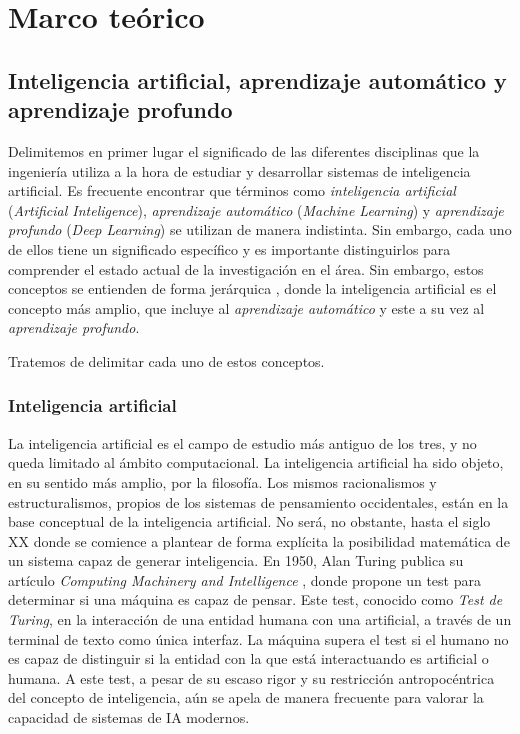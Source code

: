 \chapter{Marco teórico}

\section{Inteligencia artificial, aprendizaje automático y aprendizaje profundo}

Delimitemos en primer lugar el significado de las diferentes disciplinas que la ingeniería utiliza a la hora de estudiar y desarrollar sistemas de inteligencia artificial. Es frecuente encontrar que términos como \textit{inteligencia artificial} (\textit{Artificial Inteligence}), \textit{aprendizaje automático} (\textit{Machine Learning}) y \textit{aprendizaje profundo} (\textit{Deep Learning}) se utilizan de manera indistinta. Sin embargo, cada uno de ellos tiene un significado específico y es importante distinguirlos para comprender el estado actual de la investigación en el área. Sin embargo, estos conceptos se entienden de forma jerárquica \cite{}, donde la inteligencia artificial es el concepto más amplio, que incluye al \textit{aprendizaje automático} y este a su vez al \textit{aprendizaje profundo}.

Tratemos de delimitar cada uno de estos conceptos.

\subsection{Inteligencia artificial}

La inteligencia artificial es el campo de estudio más antiguo de los tres, y no queda limitado al ámbito computacional. La inteligencia artificial ha sido objeto, en su sentido más amplio, por la filosofía. Los mismos racionalismos y estructuralismos, propios de los sistemas de pensamiento occidentales, están en la base conceptual de la inteligencia artificial. No será, no obstante, hasta el siglo XX donde se comience a plantear de forma explícita la posibilidad matemática de un sistema capaz de generar inteligencia. En 1950, Alan Turing publica su artículo \textit{Computing Machinery and Intelligence} \cite{alan1950a}, donde propone un test para determinar si una máquina es capaz de pensar. Este test, conocido como \textit{Test de Turing}, en la interacción de una entidad humana con una artificial, a través de un terminal de texto como única interfaz. La máquina supera el test si el humano no es capaz de distinguir si la entidad con la que está interactuando es artificial o humana. A este test, a pesar de su escaso rigor y su restricción antropocéntrica del concepto de inteligencia, aún se apela de manera frecuente para valorar la capacidad de sistemas de IA modernos.

